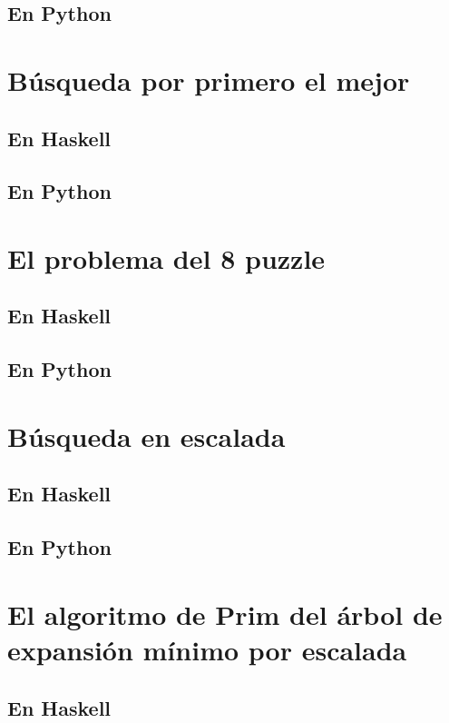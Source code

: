 \documentclass[a4paper,12pt,twoside]{book}
\begin{document}
\subsection{En Python}

\section{Búsqueda por primero el mejor}
\subsection{En Haskell}
\subsection{En Python}

\section{El problema del 8 puzzle}
\subsection{En Haskell}
\subsection{En Python}

\section{Búsqueda en escalada}
\subsection{En Haskell}
\subsection{En Python}

\section{El algoritmo de Prim del árbol de expansión mínimo por escalada}
\subsection{En Haskell}
\end{document}
